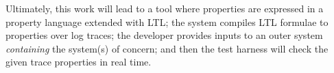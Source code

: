 Ultimately, this work will lead to a tool where properties are expressed in a
property language extended with LTL; the system compiles LTL formulae to
properties over log traces; the developer provides inputs to an outer system
\emph{containing} the system(s) of concern; and then the test harness will check
the given trace properties in real time.




